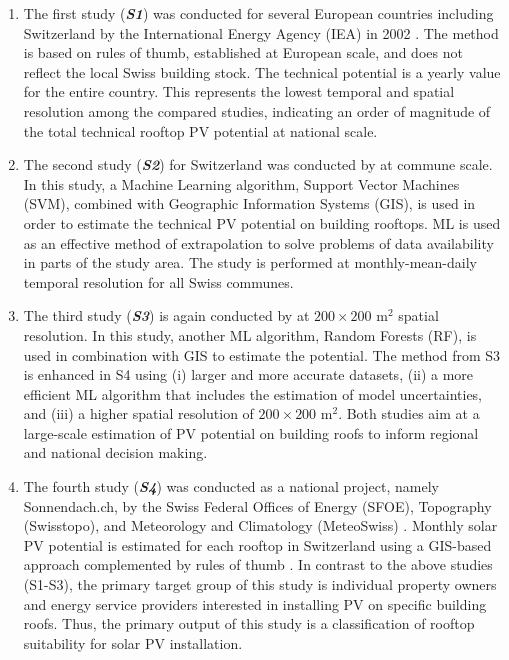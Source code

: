 \begin{enumerate}
\item The first study (\textit{\textbf{S1}}) was conducted for several European countries including Switzerland by the International Energy Agency (IEA) in 2002 \cite{iea_potential_2002}. The method is based on rules of thumb, established at European scale, and does not reflect the local Swiss building stock. The technical potential is a yearly value for the entire country. This represents the lowest temporal and spatial resolution among the compared studies, indicating an order of magnitude of the total technical rooftop PV potential at national scale. 
\item The second study (\textit{\textbf{S2}}) for Switzerland was conducted by \citet{assouline_quantifying_2017} at commune scale. In this study, a Machine Learning algorithm, Support Vector Machines (SVM), combined with Geographic Information Systems (GIS), is used in order to estimate the technical PV potential on building rooftops. ML is used as an effective method of extrapolation to solve problems of data availability in parts of the study area. The study is performed at monthly-mean-daily temporal resolution for all Swiss communes. 
\item The third study (\textit{\textbf{S3}}) is again conducted by \citet{assouline_large-scale_2018} at $200 \times 200$ m$^2$ spatial resolution. In this study, another ML algorithm, Random Forests (RF), is used in combination with GIS to estimate the potential. The method from S3 is enhanced in S4 using (i) larger and more accurate datasets, (ii) a more efficient  ML algorithm that includes the estimation of model uncertainties, and (iii) a higher spatial resolution of $200 \times 200$ m$^2$. Both studies aim at a large-scale estimation of PV potential on building roofs to inform regional and national decision making.
\item The fourth study (\textbf{\textit{S4}}) was conducted as a national project, namely Sonnendach.ch, by the Swiss Federal Offices of Energy (SFOE), Topography (Swisstopo), and Meteorology and Climatology (MeteoSwiss) \cite{klauser_solarpotentialanalyse_2016,portmann_sonnendach.ch:_2016}. Monthly solar PV potential is estimated for each rooftop in Switzerland using a GIS-based approach \cite{klauser_solarpotentialanalyse_2016} complemented by rules of thumb \cite{portmann_sonnendach.ch:_2016}. In contrast to the above studies (S1-S3), the primary target group of this study is individual property owners and energy service providers interested in installing PV on specific building roofs. Thus, the primary output of this study is a classification of rooftop suitability for solar PV installation.

\end{enumerate}
